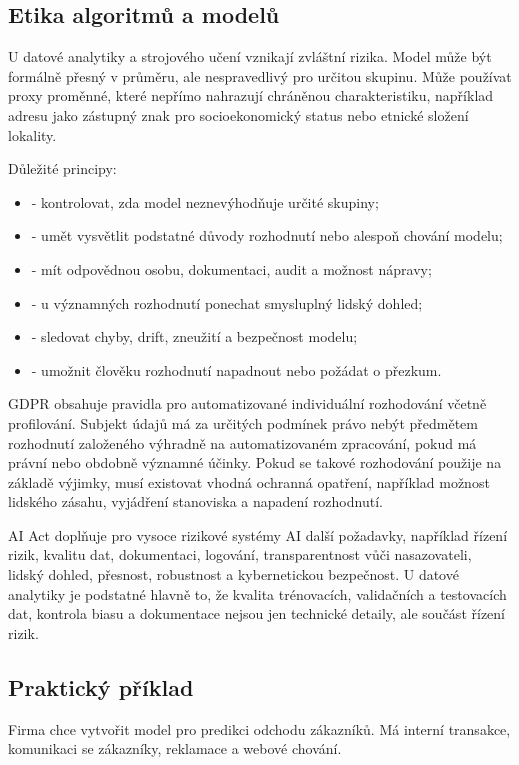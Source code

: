 \subsection{Etika algoritmů a modelů}
U datové analytiky a strojového učení vznikají zvláštní rizika. Model může být formálně přesný v
průměru, ale nespravedlivý pro určitou skupinu. Může používat proxy proměnné, které nepřímo nahrazují
chráněnou charakteristiku, například adresu jako zástupný znak pro socioekonomický status nebo etnické
složení lokality.

Důležité principy:
\begin{itemize}
  \item {} - kontrolovat, zda model neznevýhodňuje určité skupiny;
  \item {} - umět vysvětlit podstatné důvody rozhodnutí nebo alespoň chování modelu;
  \item {} - mít odpovědnou osobu, dokumentaci, audit a možnost nápravy;
  \item {} - u významných rozhodnutí ponechat smysluplný lidský dohled;
  \item {} - sledovat chyby, drift, zneužití a bezpečnost modelu;
  \item {} - umožnit člověku rozhodnutí napadnout nebo požádat o přezkum.
\end{itemize}

GDPR obsahuje pravidla pro automatizované individuální rozhodování včetně profilování. Subjekt údajů
má za určitých podmínek právo nebýt předmětem rozhodnutí založeného výhradně na automatizovaném
zpracování, pokud má právní nebo obdobně významné účinky. Pokud se takové rozhodování použije na
základě výjimky, musí existovat vhodná ochranná opatření, například možnost lidského zásahu, vyjádření
stanoviska a napadení rozhodnutí.

AI Act doplňuje pro vysoce rizikové systémy AI další požadavky, například řízení rizik, kvalitu dat,
dokumentaci, logování, transparentnost vůči nasazovateli, lidský dohled, přesnost, robustnost a
kybernetickou bezpečnost. U datové analytiky je podstatné hlavně to, že kvalita trénovacích,
validačních a testovacích dat, kontrola biasu a dokumentace nejsou jen technické detaily, ale součást
řízení rizik.

\subsection{Praktický příklad}
Firma chce vytvořit model pro predikci odchodu zákazníků. Má interní transakce, komunikaci se zákazníky,
reklamace a webové chování.


